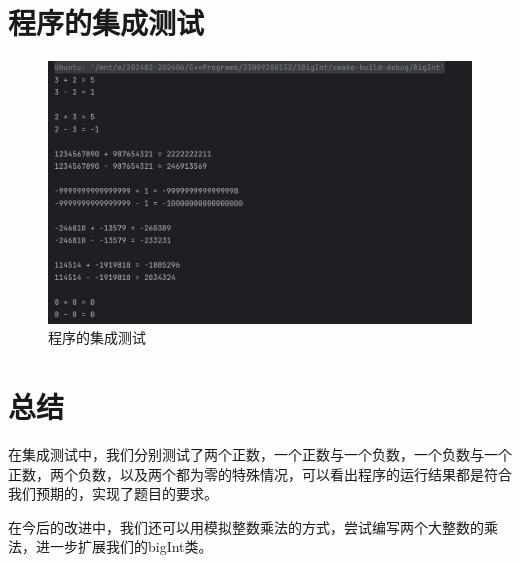\documentclass{ctexart}
\begin{document}
    \section{程序的集成测试}
    
    \begin{figure}[h] %
    \centering
    \includegraphics[width=1\textwidth]{tests.png}
    \caption{程序的集成测试}
        
    \end{figure}
    
    \section{总结}
    在集成测试中，我们分别测试了两个正数，一个正数与一个负数，一个负数与一个正数，两个负数，以及两个都为零的特殊情况，可以看出程序的运行结果都是符合我们预期的，实现了题目的要求。
    
    在今后的改进中，我们还可以用模拟整数乘法的方式，尝试编写两个大整数的乘法，进一步扩展我们的bigInt类。

    
\end{document}
